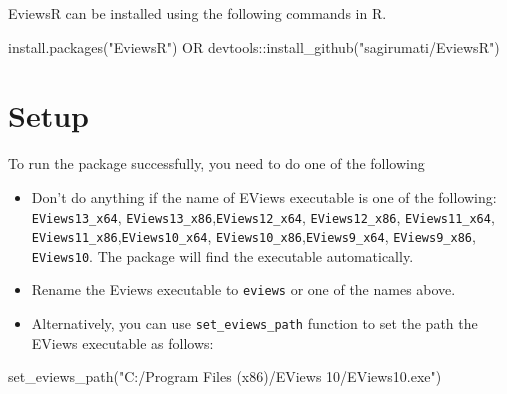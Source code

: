 \documentclass[
  letterpaper,
  DIV=11,
  numbers=noendperiod]{scrartcl}
\newenvironment{Shaded}{\begin{snugshade}}{\end{snugshade}}
\newcommand{\FunctionTok}[1]{\textcolor[rgb]{0.28,0.35,0.67}{#1}}
\newcommand{\NormalTok}[1]{\textcolor[rgb]{0.00,0.23,0.31}{#1}}
\newcommand{\SpecialCharTok}[1]{\textcolor[rgb]{0.37,0.37,0.37}{#1}}
\newcommand{\StringTok}[1]{\textcolor[rgb]{0.13,0.47,0.30}{#1}}
\begin{document}
EviewsR can be installed using the following commands in R.

\begin{Shaded}
\begin{Highlighting}[]
\FunctionTok{install.packages}\NormalTok{(}\StringTok{"EviewsR"}\NormalTok{)}
\NormalTok{OR}
\NormalTok{devtools}\SpecialCharTok{::}\FunctionTok{install\_github}\NormalTok{(}\StringTok{"sagirumati/EviewsR"}\NormalTok{)}
\end{Highlighting}
\end{Shaded}

\begin{figure}

\end{figure}

\hypertarget{setup}{%
\section{Setup}\label{setup}}

To run the package successfully, you need to do one of the following

\begin{itemize}
\item
  Don't do anything if the name of EViews executable is one of the
  following: \texttt{EViews13\_x64},
  \texttt{EViews13\_x86},\texttt{EViews12\_x64}, \texttt{EViews12\_x86},
  \texttt{EViews11\_x64}, \texttt{EViews11\_x86},\texttt{EViews10\_x64},
  \texttt{EViews10\_x86},\texttt{EViews9\_x64}, \texttt{EViews9\_x86},
  \texttt{EViews10}. The package will find the executable automatically.
\item
  Rename the Eviews executable to \texttt{eviews} or one of the names
  above.
\item
  Alternatively, you can use \texttt{set\_eviews\_path} function to set
  the path the EViews executable as follows:
\end{itemize}

\begin{Shaded}
\begin{Highlighting}[]
\FunctionTok{set\_eviews\_path}\NormalTok{(}\StringTok{"C:/Program Files (x86)/EViews 10/EViews10.exe"}\NormalTok{)}
\end{Highlighting}
\end{Shaded}

\begin{figure}

\end{figure}
\end{document}
